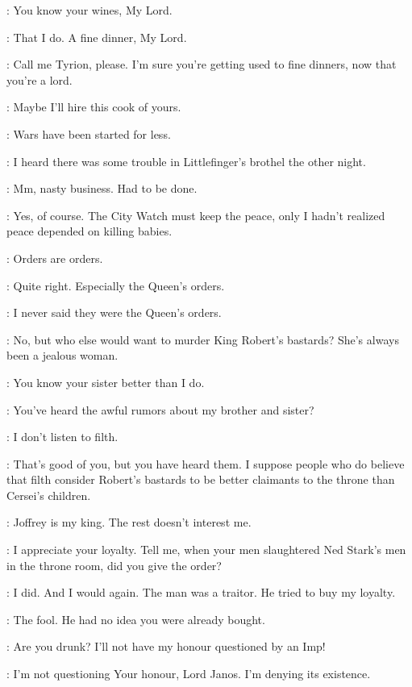 \TYRION: You know your wines, My Lord.

\JANOSSLYNT: That I do. A fine dinner, My Lord.

\TYRION: Call me Tyrion, please. I'm sure you're getting used to fine dinners, now that you're a lord.

\JANOSSLYNT: Maybe I'll hire this cook of yours.

\TYRION: Wars have been started for less.


\TYRION: I heard there was some trouble in Littlefinger's brothel the other night.

\JANOSSLYNT: Mm, nasty business. Had to be done.

\TYRION: Yes, of course. The City Watch must keep the peace, only I hadn't realized peace depended on killing babies.

\JANOSSLYNT: Orders are orders.

\TYRION: Quite right. Especially the Queen's orders.

\JANOSSLYNT: I never said they were the Queen's orders.

\TYRION: No, but who else would want to murder King Robert's bastards? She's always been a jealous woman.

\JANOSSLYNT: You know your sister better than I do.

\TYRION: You've heard the awful rumors about my brother and sister?

\JANOSSLYNT: I don't listen to filth.

\TYRION: That's good of you, but you have heard them. I suppose people who do believe that filth consider Robert's bastards to be better claimants to the throne than Cersei's children.

\JANOSSLYNT: Joffrey is my king. The rest doesn't interest me.

\TYRION: I appreciate your loyalty. Tell me, when your men slaughtered Ned Stark's men in the throne room, did you give the order?

\JANOSSLYNT: I did. And I would again. The man was a traitor. He tried to buy my loyalty.

\TYRION: The fool. He had no idea you were already bought.

\JANOSSLYNT: Are you drunk? I'll not have my honour questioned by an Imp!

\TYRION: I'm not questioning Your honour, Lord Janos. I'm denying its existence.

